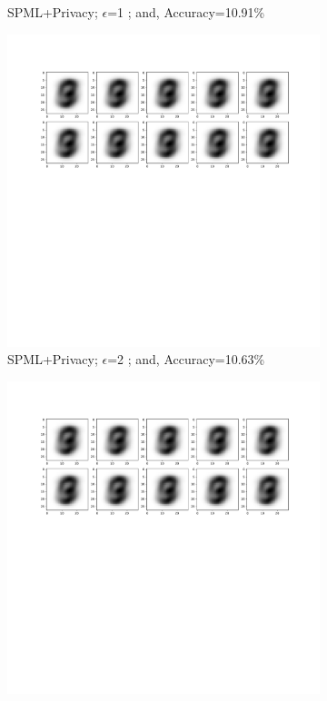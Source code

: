 \begin{figure}[h!]
\begin{subfigure}{.325\textwidth}
         \vspace{-8em}
         \caption{SPML+Privacy; $\epsilon$=1 ; and, Accuracy=10.91\%}
         \label{default}
     \end{subfigure}
     \begin{subfigure}{.325\textwidth}
         \includegraphics[width=\textwidth]{images/Native_attack/Mnistattack2.pdf}
         \vspace{-8em}
         \caption{SPML+Privacy; $\epsilon$=2 ; and, Accuracy=10.63\%}
         \label{default}
     \end{subfigure}
     \begin{subfigure}{.325\textwidth}
         \includegraphics[width=\textwidth]{images/Native_attack/Mnistattack4.pdf}

\end{subfigure}
\end{figure}
